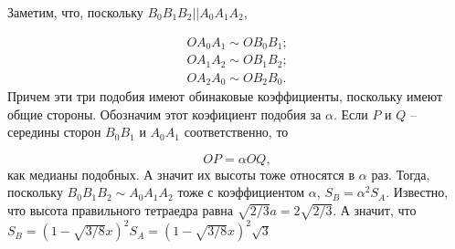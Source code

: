 
Заметим, что, поскольку $B_0B_1B_2 || A_0A_1A_2$, 

\begin{align*}
OA_0A_1 \sim OB_0B_1; \\
OA_1A_2 \sim OB_1B_2; \\
OA_2A_0 \sim OB_2B_0.
\end{align*}
Причем эти три подобия имеют обинаковые коэффициенты, поскольку имеют общие стороны. Обозначим этот коэфициент подобия за $\alpha$. Если $P$ и $Q$ -- середины сторон $B_0B_1$ и $A_0A_1$ соответственно, то 

\begin{equation}
OP = \alpha OQ,
\end{equation}
как медианы подобных. А значит их высоты тоже относятся в $\alpha$ раз. Тогда, поскольку $B_0B_1B_2 \sim A_0A_1A_2$ тоже с коэффициентом $\alpha$, $S_B = \alpha^2 S_A$. Известно, что высота правильного тетраедра равна $\sqrt{2/3}a = 2\sqrt{2/3}$. А значит, что $S_B={(1 - \sqrt{3/8}x)}^2 S_A = {(1 - \sqrt{3/8}x)}^2 \sqrt{3}$
